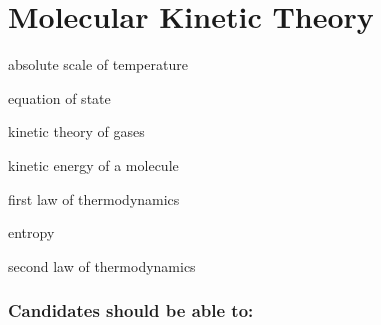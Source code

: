 \documentclass[main.tex]{subfiles}
\begin{document}
\chapter{Molecular Kinetic Theory}
\begin{content}
\item absolute scale of temperature
\item equation of state
\item kinetic theory of gases
\item kinetic energy of a molecule
\item first law of thermodynamics
\item entropy
\item second law of thermodynamics
\end{content}

\subsection{Candidates should be able to:}

\end{document}
